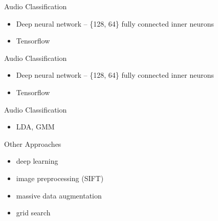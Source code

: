 \documentclass{beamer}
\begin{document}
\begin{frame}{Audio Classification}
    \begin{itemize}
        \item Deep neural network -- \{128, 64\} fully connected inner neurons
        \item Tensorflow
    \end{itemize}
\end{frame}

\begin{frame}{Audio Classification}
    \begin{itemize}
        \item Deep neural network -- \{128, 64\} fully connected inner neurons
        \item Tensorflow
    \end{itemize}
\end{frame}

\begin{frame}{Audio Classification}
    \begin{itemize}
        \item LDA, GMM
    \end{itemize}
\end{frame}

\begin{frame}{Other Approaches}
    \begin{itemize}
        \item deep learning
        \item image preprocessing (SIFT)
        \item massive data augmentation
        \item grid search
    \end{itemize}
\end{frame}
\end{document}
